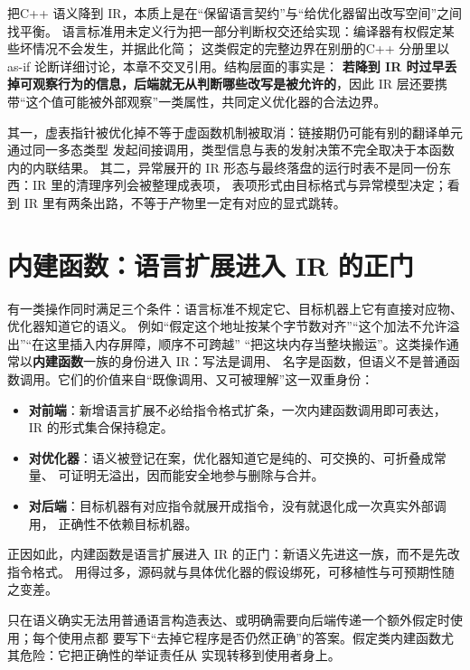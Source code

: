 \documentclass[12pt,a4paper,fontset=fandol]{ctexbook}
\newcommand{\cpp}[1]{C++#1}
\begin{document}
把\cpp{} 语义降到 IR，本质上是在“保留语言契约”与“给优化器留出改写空间”之间找平衡。
语言标准用未定义行为把一部分判断权交还给实现：编译器有权假定某些坏情况不会发生，并据此化简；
这类假定的完整边界在别册的\cpp{} 分册里以 as-if 论断详细讨论，本章不交叉引用。结构层面的事实是：
\textbf{若降到 IR 时过早丢掉可观察行为的信息，后端就无从判断哪些改写是被允许的}，因此 IR 层还要携带“这个值可能被外部观察”一类属性，共同定义优化器的合法边界。

\begin{warning}[title={IR 上的两处常见误解}]
其一，虚表指针被优化掉不等于虚函数机制被取消：链接期仍可能有别的翻译单元通过同一多态类型
发起间接调用，类型信息与表的发射决策不完全取决于本函数内的内联结果。
其二，异常展开的 IR 形态与最终落盘的运行时表不是同一份东西：IR 里的清理序列会被整理成表项，
表项形式由目标格式与异常模型决定；看到 IR 里有两条出路，不等于产物里一定有对应的显式跳转。
\end{warning}

\section{内建函数：语言扩展进入 IR 的正门}\label{sec:cl04-intrinsics}

有一类操作同时满足三个条件：语言标准不规定它、目标机器上它有直接对应物、优化器知道它的语义。
例如“假定这个地址按某个字节数对齐”“这个加法不允许溢出”“在这里插入内存屏障，顺序不可跨越”
“把这块内存当整块搬运”。这类操作通常以\textbf{内建函数}一族的身份进入 IR：写法是调用、
名字是函数，但语义不是普通函数调用。它们的价值来自“既像调用、又可被理解”这一双重身份：

\begin{itemize}
  \item \textbf{对前端}：新增语言扩展不必给指令格式扩条，一次内建函数调用即可表达，
        IR 的形式集合保持稳定。
  \item \textbf{对优化器}：语义被登记在案，优化器知道它是纯的、可交换的、可折叠成常量、
        可证明无溢出，因而能安全地参与删除与合并。
  \item \textbf{对后端}：目标机器有对应指令就展开成指令，没有就退化成一次真实外部调用，
        正确性不依赖目标机器。
\end{itemize}

正因如此，内建函数是语言扩展进入 IR 的正门：新语义先进这一族，而不是先改指令格式。
用得过多，源码就与具体优化器的假设绑死，可移植性与可预期性随之变差。

\begin{guideline}[title={内建函数使用原则}]
只在语义确实无法用普通语言构造表达、或明确需要向后端传递一个额外假定时使用；每个使用点都
要写下“去掉它程序是否仍然正确”的答案。假定类内建函数尤其危险：它把正确性的举证责任从
实现转移到使用者身上。
\end{guideline}
\end{document}
